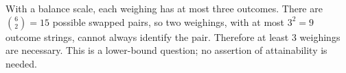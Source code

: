 With a balance scale, each weighing has at most three outcomes. There are $\binom62=15$ possible swapped pairs, so two weighings, with at most $3^2=9$ outcome strings, cannot always identify the pair. Therefore at least $\boxed3$ weighings are necessary. This is a lower-bound question; no assertion of attainability is needed.
